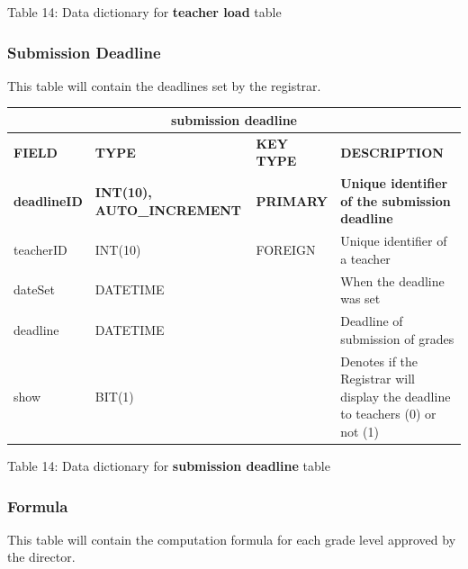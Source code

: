 \documentclass[11pt,a4paper,titlepage]{article}
\begin{document}
\vspace{.5cm}
\begin{center}
    Table 14: Data dictionary for \textbf{teacher load} table
\end{center}

\newpage

\subsubsection{Submission Deadline}

This table will contain the deadlines set by the registrar.

\vspace{1cm}
\begin{longtable}{ |p{2.5cm}|p{4.5cm}|p{2.5cm}|p{3cm}|  }
    \hline
    \multicolumn{4}{|c|}{\textbf{submission deadline}} \\
    \hline
    \textbf{FIELD}&\textbf{TYPE}&\textbf{KEY TYPE}&\textbf{DESCRIPTION}\\
    \hline
    \textbf{deadlineID}  & \textbf{INT(10), AUTO\_INCREMENT} & \textbf{PRIMARY} & \textbf{Unique identifier of the submission deadline}\\ \hline
    teacherID   & INT(10) & FOREIGN & Unique identifier of a teacher\\ \hline
    dateSet   & DATETIME &  & When the deadline was set\\ \hline
    deadline   & DATETIME &  & Deadline of submission of grades\\ \hline
    show   & BIT(1) &  & Denotes if the Registrar will display the deadline to teachers (0) or not (1)\\ \hline
\end{longtable}

\vspace{.5cm}
\begin{center}
    Table 14: Data dictionary for \textbf{submission deadline} table
\end{center}

\newpage

\subsubsection{Formula}

This table will contain the computation formula for each grade level approved by the director.
\end{document}

